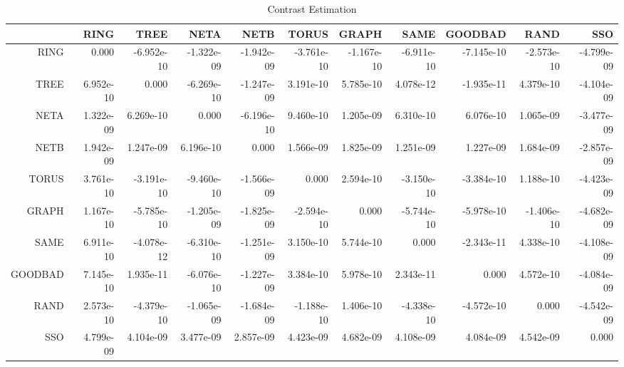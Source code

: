 \documentclass[a4paper,10pt]{article}
\begin{document}
\begin{landscape}
\begin{table}[!htp]
\centering\tiny
\caption{Contrast Estimation}
\begin{tabular}{
|r|r|r|r|r|r|r|r|r|r|r|}
\hline
 & RING& TREE& NETA& NETB& TORUS& GRAPH& SAME& GOODBAD& RAND& SSO\\
\hline
 RING&0.000&-6.952e-10&-1.322e-09&-1.942e-09&-3.761e-10&-1.167e-10&-6.911e-10&-7.145e-10&-2.573e-10&-4.799e-09\\
\hline
 TREE&6.952e-10&0.000&-6.269e-10&-1.247e-09&3.191e-10&5.785e-10&4.078e-12&-1.935e-11&4.379e-10&-4.104e-09\\
\hline
 NETA&1.322e-09&6.269e-10&0.000&-6.196e-10&9.460e-10&1.205e-09&6.310e-10&6.076e-10&1.065e-09&-3.477e-09\\
\hline
 NETB&1.942e-09&1.247e-09&6.196e-10&0.000&1.566e-09&1.825e-09&1.251e-09&1.227e-09&1.684e-09&-2.857e-09\\
\hline
 TORUS&3.761e-10&-3.191e-10&-9.460e-10&-1.566e-09&0.000&2.594e-10&-3.150e-10&-3.384e-10&1.188e-10&-4.423e-09\\
\hline
 GRAPH&1.167e-10&-5.785e-10&-1.205e-09&-1.825e-09&-2.594e-10&0.000&-5.744e-10&-5.978e-10&-1.406e-10&-4.682e-09\\
\hline
 SAME&6.911e-10&-4.078e-12&-6.310e-10&-1.251e-09&3.150e-10&5.744e-10&0.000&-2.343e-11&4.338e-10&-4.108e-09\\
\hline
 GOODBAD&7.145e-10&1.935e-11&-6.076e-10&-1.227e-09&3.384e-10&5.978e-10&2.343e-11&0.000&4.572e-10&-4.084e-09\\
\hline
 RAND&2.573e-10&-4.379e-10&-1.065e-09&-1.684e-09&-1.188e-10&1.406e-10&-4.338e-10&-4.572e-10&0.000&-4.542e-09\\
\hline
 SSO&4.799e-09&4.104e-09&3.477e-09&2.857e-09&4.423e-09&4.682e-09&4.108e-09&4.084e-09&4.542e-09&0.000\\
\hline

\end{tabular}
\end{table}

\newpage


\end{landscape}
\end{document}
